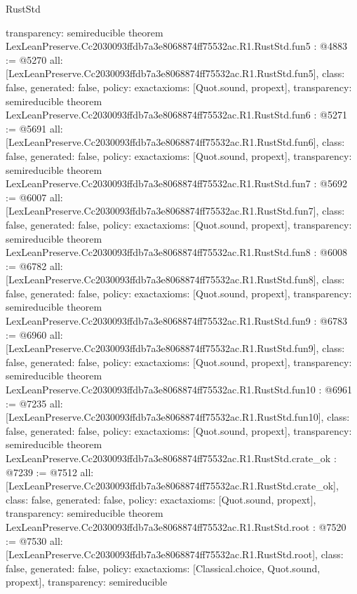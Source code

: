 \begin{lexlean}{RustStd}
\begin{coremodule}
{  transparency: semireducible
}
theorem LexLeanPreserve.Cc2030093ffdb7a3e8068874ff75532ac.R1.RustStd.fun5 : @4883 := @5270 {
  all: [LexLeanPreserve.Cc2030093ffdb7a3e8068874ff75532ac.R1.RustStd.fun5],
  class: false,
  generated: false,
  policy: exact{axioms: [Quot.sound, propext]},
  transparency: semireducible
}
theorem LexLeanPreserve.Cc2030093ffdb7a3e8068874ff75532ac.R1.RustStd.fun6 : @5271 := @5691 {
  all: [LexLeanPreserve.Cc2030093ffdb7a3e8068874ff75532ac.R1.RustStd.fun6],
  class: false,
  generated: false,
  policy: exact{axioms: [Quot.sound, propext]},
  transparency: semireducible
}
theorem LexLeanPreserve.Cc2030093ffdb7a3e8068874ff75532ac.R1.RustStd.fun7 : @5692 := @6007 {
  all: [LexLeanPreserve.Cc2030093ffdb7a3e8068874ff75532ac.R1.RustStd.fun7],
  class: false,
  generated: false,
  policy: exact{axioms: [Quot.sound, propext]},
  transparency: semireducible
}
theorem LexLeanPreserve.Cc2030093ffdb7a3e8068874ff75532ac.R1.RustStd.fun8 : @6008 := @6782 {
  all: [LexLeanPreserve.Cc2030093ffdb7a3e8068874ff75532ac.R1.RustStd.fun8],
  class: false,
  generated: false,
  policy: exact{axioms: [Quot.sound, propext]},
  transparency: semireducible
}
theorem LexLeanPreserve.Cc2030093ffdb7a3e8068874ff75532ac.R1.RustStd.fun9 : @6783 := @6960 {
  all: [LexLeanPreserve.Cc2030093ffdb7a3e8068874ff75532ac.R1.RustStd.fun9],
  class: false,
  generated: false,
  policy: exact{axioms: [Quot.sound, propext]},
  transparency: semireducible
}
theorem LexLeanPreserve.Cc2030093ffdb7a3e8068874ff75532ac.R1.RustStd.fun10 : @6961 := @7235 {
  all: [LexLeanPreserve.Cc2030093ffdb7a3e8068874ff75532ac.R1.RustStd.fun10],
  class: false,
  generated: false,
  policy: exact{axioms: [Quot.sound, propext]},
  transparency: semireducible
}
theorem LexLeanPreserve.Cc2030093ffdb7a3e8068874ff75532ac.R1.RustStd.crate_ok : @7239 := @7512 {
  all: [LexLeanPreserve.Cc2030093ffdb7a3e8068874ff75532ac.R1.RustStd.crate_ok],
  class: false,
  generated: false,
  policy: exact{axioms: [Quot.sound, propext]},
  transparency: semireducible
}
theorem LexLeanPreserve.Cc2030093ffdb7a3e8068874ff75532ac.R1.RustStd.root : @7520 := @7530 {
  all: [LexLeanPreserve.Cc2030093ffdb7a3e8068874ff75532ac.R1.RustStd.root],
  class: false,
  generated: false,
  policy: exact{axioms: [Classical.choice, Quot.sound, propext]},
  transparency: semireducible
}


\end{coremodule}
\end{lexlean}
